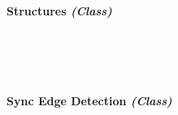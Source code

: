 \begin{FlushLeft}
\begin{enumerate}
    \begin{figure}[H]
        \centering
    \end{figure}\\

    \bk

    \paragraph{Structures \textit{(Class)}} \mbox{} \\

    \begin{figure}[H]
        \centering
    \end{figure}\\

    \bk

    \paragraph{Sync Edge Detection \textit{(Class)}} \mbox{} \\


\end{enumerate}
\end{FlushLeft}
